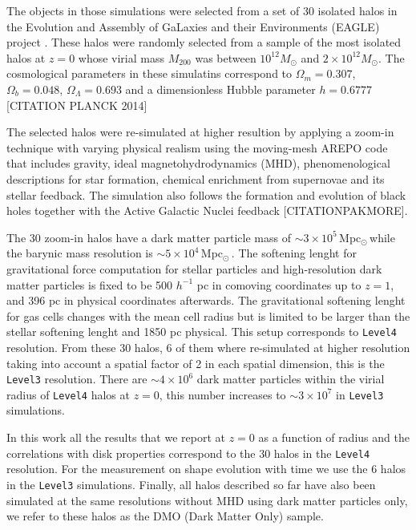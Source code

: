 \documentclass[a4paper,fleqn,usenatbib]{mnras}
\newcommand{\Msun}{\,{\rm Mpc}$_{\odot}$\,}
\begin{document}
The objects in those simulations were selected from a set of 30
isolated halos in the Evolution and Assembly of GaLaxies and their
Environments (EAGLE)  project \citep{Eagle}.   
These halos were randomly selected from a sample of the most isolated
halos at $z=0$ whose virial mass $M_{200}$ was between $10^{12}M_\odot$ and
$2\times 10^{12}M_\odot$. 
The cosmological parameters in these simulatins correspond to
$\Omega_m=0.307$, $\Omega_b=0.048$, $\Omega_\Lambda=0.693$ and a
dimensionless Hubble parameter $h=0.6777$ [CITATION PLANCK 2014]


The selected halos were re-simulated at higher resultion by applying a
zoom-in technique with varying physical realism using the moving-mesh AREPO code
that includes gravity, ideal magnetohydrodynamics (MHD), 
phenomenological descriptions for star formation, chemical enrichment
from supernovae and its stellar feedback.  The simulation also follows
the formation and evolution of black holes together with the Active
Galactic Nuclei feedback \citep{arepo} [CITATIONPAKMORE].  


The 30 zoom-in halos have a dark matter particle mass of $\sim 3\times
10^5$\Msun while the barynic mass resolution is $\sim 5\times 10^4$\Msun.
The softening lenght for gravitational force computation for stellar
particles and high-resolution dark matter particles 
is fixed to be 500 $h^{-1}$ pc in comoving coordinates up to $z=1$,
and 396 pc in physical coordinates afterwards.
The gravitational softening lenght for gas cells changes with the mean
cell radius but is limited to be larger than the stellar softening
lenght and 1850 pc physical. 
This setup corresponds to \texttt{Level4} resolution.
From these 30 halos, 6 of them where re-simulated at higher resolution
taking into account a spatial factor of 2 in each spatial dimension,
this is the \texttt{Level3} resolution.  
There are $\sim 4\times 10^6$ dark matter particles within the virial radius
of \texttt{Level4} halos at $z=0$, this number increases to $\sim 3\times 10^7$ in
\texttt{Level3} simulations. 
 
In this work all the results that we report at $z=0$ as a function of radius and
the correlations with disk properties correspond to the 30 halos in
the \texttt{Level4} resolution. 
For the measurement on shape evolution with time we use the 6 halos in
the \texttt{Level3} simulations.
Finally, all  halos described so far have also been simulated at the same
resolutions without MHD using dark matter particles only, we refer to
these halos as the DMO (Dark Matter Only) sample.
\end{document}
